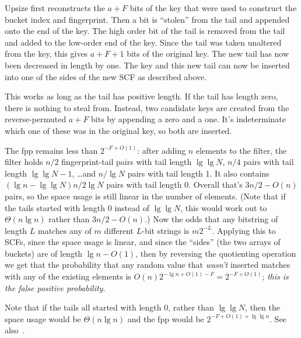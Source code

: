 \documentclass[letterpaper,twocolumn,10pt]{article}
\newcommand{\TCF}{SCF}
\newcommand{\TCF}{TCF}
\begin{document}
Upsize first reconstructs the $a+F$ bits of the key that were used to construct the bucket index and fingerprint. %
Then a bit is ``stolen'' from the tail and appended onto the end of the key. %
The high order bit of the tail is removed from the tail and added to the low-order end of the key.
Since the tail was taken unaltered from the key, this gives $a+F+1$ bits of the original key.
The new tail has now been decreased in length by one.
The key and this new tail can now be inserted into one of the sides of the new \TCF{} as described above. %

This works as long as the tail has positive length.
If the tail has length zero, there is nothing to steal from.
Instead, two candidate keys are created from the reverse-permuted $a+F$ bits by appending a zero and a one. %
It's indeterminate which one of these was in the original key, so both are inserted. %

The fpp remains less than $2^{-F+O(1)}$:
after adding $n$ elements to the filter, the filter holds $n/2$ fingerprint-tail pairs with tail length $\lg \lg N$, $n/4$ pairs with tail length $\lg \lg N - 1$, \dots and $n/\lg N$ pairs with tail length 1.
It also contains $(\lg n - \lg \lg N)  n / 2 \lg N$ pairs with tail length 0.
Overall that's $3n/2 - O(n)$ pairs, so the space usage is still linear in the number of elements.
(Note that if the tails started with length 0 instead of $\lg \lg N$, this would work out to $\Theta(n \lg n)$ rather than $3n/2 - O(n)$.)
Now the odds that any bitstring of length $L$ matches any of $m$ different $L$-bit strings is $m 2^{-L}$.
Applying this to \TCF{}s, since the space usage is linear, and since the ``sides'' (the two arrays of buckets) are of length $\lg n - O(1)$, then by reversing the quotienting operation we get that the probability that any random value that {\em wasn't} inserted matches with any of the existing elements is $O(n) 2^{-\lg n + O(1) - F} = 2^{-F+O(1)}$; {\em this is the false positive probability}.

Note that if the tails all started with length 0, rather than $\lg \lg N$, then the space usage would be $\Theta(n \lg n)$ and the fpp would be $2^{-F+O(1) + \lg \lg n}$.
See also~\cite{psw}.

\end{document}
